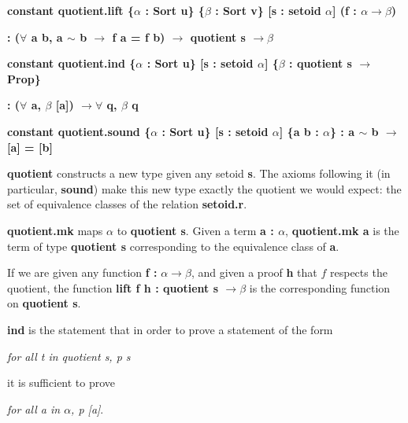 \documentclass[runningheads,a4paper]{llncs}
\renewcommand{\a}{\alpha}
\renewcommand{\b}{\beta}
\renewcommand{\-}{\setminus}
\begin{document}
\vspace{4 mm}

\hspace{2 em}\textbf{constant quotient.lift \{$\a$ : Sort u\} \{$\b$ : Sort v\} [s : setoid $\a$] (f : $\a \to \b$)}

\hspace{4 em}\textbf{: ($\forall$ a b, a $\sim$ b $\to$ f a = f b) $\to$ quotient s $\to \b$}

\vspace{4 mm}

\hspace{2 em}\textbf{constant quotient.ind \{$\a$ : Sort u\} [s : setoid $\a$] \{$\b$ : quotient s $\to$ Prop\} }

\hspace{4 em}\textbf{: ($\forall$ a, $\b$ [a]) $\to \forall$ q, $\b$ q}

\vspace{4 mm}

\hspace{2 em}\textbf{constant quotient.sound \{$\a$ : Sort u\} [s : setoid $\a$] \{a b : $\a$\} : a $\sim$ b $\to$ [a] = [b]}
\vspace{2 mm}

\textbf{quotient} constructs a new type given any setoid \textbf{s}. The axioms following it (in particular, \textbf{sound}) make this new type exactly the quotient we would expect: the set of equivalence classes of the relation \textbf{setoid.r}.

\textbf{quotient.mk} maps $\a$ to \textbf{quotient s}. Given a term \textbf{a : $\a$}, \textbf{quotient.mk a} is the term of type \textbf{quotient s} corresponding to the equivalence class of \textbf{a}.

If we are given any function \textbf{f :} $\a \to \b$, and given a proof \textbf{h} that $f$ respects the quotient, the function \textbf{lift f h : quotient s $\to \b$} is the corresponding function on \textbf{quotient s}.

\textbf{ind} is the statement that in order to prove a statement of the form

\vspace{2 mm}
\hspace{2 em}\textit{for all t in quotient s, p s}
\vspace{2 mm}

it is sufficient to prove

\vspace{2 mm}
\hspace{2 em}\textit{for all a in $\a$, p [a]}.
\vspace{2 mm}
\end{document}
